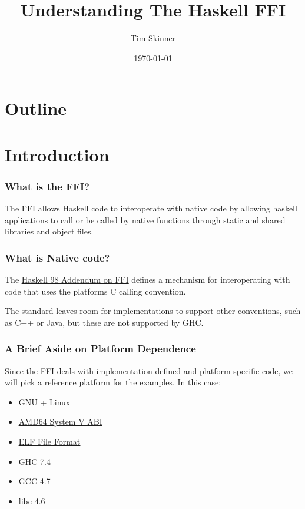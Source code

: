 \documentclass{beamer}
\title{Understanding The Haskell FFI}
\author{Tim Skinner}
\date{\today}
\newcommand{\chref}[3] {
    {\color{#1} \href{#2}{\underline{#3}}}
}
\begin{document}
\begin{frame}
    \titlepage
\end{frame}

\section*{Outline}
\begin{frame}
    \begin{tiny}
        \tableofcontents
    \end{tiny}
\end{frame}

\section{Introduction}
\begin{frame}
    \frametitle{What is the FFI?}

    The FFI allows Haskell code to interoperate with native code by allowing
    haskell applications to call or be called by native functions through
    static and shared libraries and object files.

\end{frame}

\begin{frame}
    \frametitle{What is Native code?}

    The \chref{darkgray}
    {http://www.cse.unsw.edu.au/~chak/haskell/ffi/ffi/ffi.html} {Haskell 98
    Addendum on FFI} defines a mechanism for interoperating with code that uses
    the platforms C calling convention.

    The standard leaves room for implementations to support other conventions,
    such as C++ or Java, but these are not supported by GHC.
\end{frame}

\begin{frame}
    \frametitle{A Brief Aside on Platform Dependence}

    Since the FFI deals with implementation defined and platform specific code,
    we will pick a reference platform for the examples.  In this case:

    \begin{itemize}
        \item {GNU + Linux}
        \item {\chref{darkgray}{http://www.uclibc.org/docs/psABI-x86_64.pdf}{AMD64 System V ABI}}
        \item {\chref{darkgray}{http://www.skyfree.org/linux/references/ELF_Format.pdf}{ELF File Format}}
        \item {GHC 7.4}
        \item {GCC 4.7}
        \item {libc 4.6}
    \end{itemize}
\end{frame}
\end{document}
